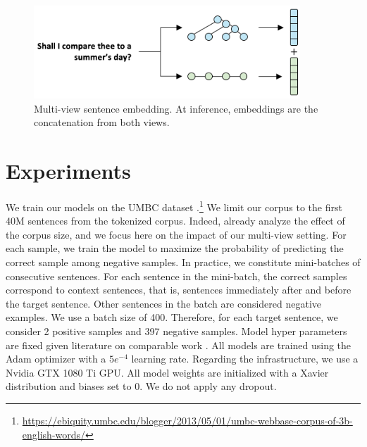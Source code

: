\begin{figure}[!htb]
\begin{center}
\includegraphics[width=10cm]{images/contrastive-inf.png}
\end{center}
\caption{Multi-view sentence embedding. At inference, embeddings are the concatenation from both views.}
\end{figure}

\section{Experiments}

We train our models on the UMBC dataset \parencite{han_13}.\footnote{\url{https://ebiquity.umbc.edu/blogger/2013/05/01/umbc-webbase-corpus-of-3b-english-words/}} We limit our corpus to the first 40M sentences from the tokenized corpus. Indeed, \textcite{logeswaran_18} already analyze the effect of the corpus size, and we focus here on the impact of our multi-view setting. For each sample, we train the model to maximize the probability of predicting the correct sample among negative samples. In practice, we constitute mini-batches of consecutive sentences. For each sentence in the mini-batch, the correct samples correspond to context sentences, that is, sentences immediately after and before the target sentence. Other sentences in the batch are considered negative examples. We use a batch size of 400. Therefore, for each target sentence, we consider 2 positive samples and 397 negative samples. Model hyper parameters are fixed given literature on comparable work \parencite{tai_15, logeswaran_18}. All models are trained using the Adam optimizer with a $5e^{-4}$ learning rate. Regarding the infrastructure, we use a Nvidia GTX 1080 Ti GPU. All model weights are initialized with a Xavier distribution and biases set to 0. We do not apply any dropout. 

